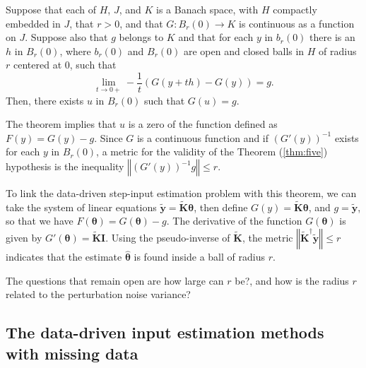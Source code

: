 \begin{customthm}{5} \label{thm:five}
Suppose that each of $H$, $J$, and $K$ is a Banach space, with $H$ compactly embedded in $J$, that $r>0$, and that $G:B_r(0) \rightarrow K$ is continuous as a function on $J$. Suppose also that $g$ belongs to $K$ and that for each $y$ in $b_r(0)$ there is an $h$ in $B_r(0)$, where $b_r(0)$ and $B_r(0)$ are open and closed balls in $H$ of radius $r$ centered at 0, such that
\begin{equation} \lim\limits_{t \to 0+} -{\dfrac{1}{t} \left(G(y+th) - G(y)\right) = g}. \end{equation}
Then, there exists $u$ in $B_r(0)$ such that $G(u)=g$.
\end{customthm}
    
The theorem implies that $u$ is a zero of the function  defined as $F(y) = G(y) - g$.  
Since $G$ is a continuous function and if $\left(G' (y) \right)^{-1}$ exists for each $y$ in $B_r(0)$, a metric for the validity of the Theorem (\ref{thm:five}) hypothesis is the inequality $\left\Vert  \left( G' (y) \right)^{-1} g \right\Vert \leq r$.
    
To link the data-driven step-input estimation problem with this theorem, we can take the system of linear equations $\widetilde{\mathbf{y}} = \widetilde{\mathbf{K}} \bm{\theta}$, then define $G(y) = \widetilde{\mathbf{K}} \bm{\theta}$, and $g = \widetilde{\mathbf{y}}$, so that we have $F(\bm{\theta}) = G(\bm{\theta}) - g$. The derivative of the function $G(\bm{\theta})$ is given by $G'(\bm{\theta}) = \widetilde{\mathbf{K}} \mathbf{I}$. Using the pseudo-inverse of $\widetilde{\mathbf{K}}$, the metric $\left\Vert  \widetilde{\mathbf{K}}^{\dagger} \widetilde{\mathbf{y}} \right\Vert \leq r$ indicates that the estimate $\hat{\bm{\theta}}$ is found inside a ball of radius $r$.

The questions that remain open are how large can $r$ be?, and how is the radius $r$ related to the perturbation noise variance? 


\subsection*{The data-driven input estimation methods with missing data}

